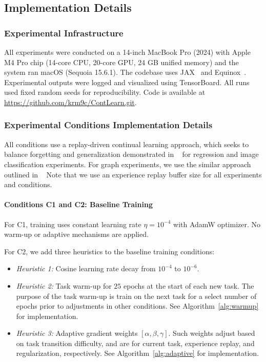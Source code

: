 
\subsection{Implementation Details}\label{sec:implementdetails}

\subsubsection{Experimental Infrastructure}  
All experiments were conducted on a 14-inch MacBook Pro (2024) with Apple M4 Pro chip (14-core CPU, 20-core GPU, 24 GB unified memory) and the system ran macOS (Sequoia 15.6.1). The codebase uses JAX~\cite{jax} and Equinox~\cite{kidger2021equinox}. Experimental outputs were logged and visualized using TensorBoard. All runs used fixed random seeds for reproducibility. Code is available at \url{https://github.com/krm9c/ContLearn.git}.

\subsubsection{Experimental Conditions Implementation Details}
All conditions use a replay-driven continual learning approach, which seeks to balance forgetting and generalization demonstrated in ~\cite{raghavan2021formalizing} for regression and image classification experiments. For graph experiments, we use the similar approach outlined in ~\cite{raghavan2023learningcontinuallysequencegraphs} Note that we use an experience replay buffer size for all experiments and conditions.

\paragraph{Conditions C1 and C2: Baseline Training }

For C1, training uses constant learning rate $\eta = 10^{-4}$ with AdamW optimizer. No warm-up or adaptive mechanisms are applied.

For C2, we add three heuristics to the baseline training conditions:
\begin{itemize}
    \item \textit{Heuristic 1:} Cosine learning rate decay from $10^{-4}$ to $10^{-6}.$
    
    \item \textit{Heuristic 2:} Task warm-up for $25$ epochs at the start of each new task. The purpose of the task warm-up is train on the next task for a select number of epochs prior to adjustments in other conditions. See Algorithm~\ref{alg:warmup} for implementation.

    \item \textit{Heuristic 3:} Adaptive gradient weights $[\alpha, \beta, \gamma].$ Such weights adjust based on task transition difficulty, and are for current task, experience replay, and regularization, respectively. See Algorithm~\ref{alg:adaptive} for implementation.
\end{itemize}

